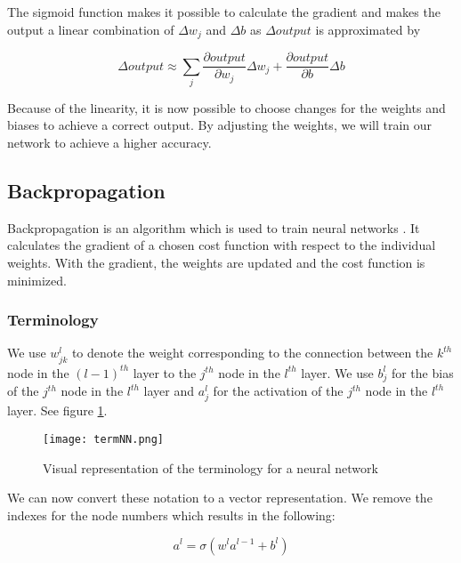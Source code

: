 \noindent The sigmoid function makes it possible to calculate the gradient and makes the output a linear combination of $\Delta w_j$ and $\Delta b$ as $\Delta output$ is approximated by 

\begin{equation} 
\Delta output \approx \sum_j \frac{\partial output}{\partial w_j}\Delta w_j + \frac{\partial output}{\partial b}\Delta b
\end{equation}

\noindent Because of the linearity, it is now possible to choose changes for the weights and biases to achieve a correct output. By adjusting the weights, we will train our network to achieve a higher accuracy.
		
	\subsection{Backpropagation}
	
Backpropagation is an algorithm which is used to train neural networks \cite{bp:article}. It calculates the gradient of a chosen cost function with respect to the individual weights. With the gradient, the weights are updated and the cost function is minimized.

		\subsubsection{Terminology}
		
We use $w^l_{jk}$ to denote the weight corresponding to the connection between the $k^{th}$ node in the $(l-1)^{th}$ layer to the $j^{th}$ node in the $l^{th}$ layer. We use $b^l_j$ for the bias of the $j^{th}$ node in the $l^{th}$ layer and $a^l_j$ for the activation of the $j^{th}$ node in the $l^{th}$ layer. See figure \ref{fig:termNN}.

\begin{figure}[htbp]
	\centering
	\texttt{[image: termNN.png]}
	\caption{Visual representation of the terminology for a neural network \cite{NNintro:online}}
	\label{fig:termNN}
\end{figure} 

We can now convert these notation to a vector representation. We remove the indexes for the node numbers which results in the following:

\begin{equation} 
a^l = \sigma (w^la^{l-1}+b^l)
\end{equation}

